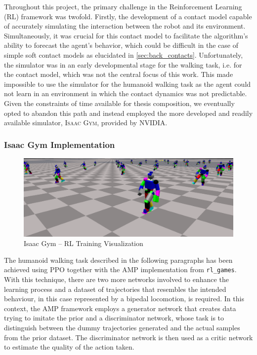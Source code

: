 Throughout this project, the primary challenge in the Reinforcement Learning (\ac{RL}) framework was twofold. Firstly, the development of a contact model capable of accurately simulating the interaction between the robot and its environment. Simultaneously, it was crucial for this contact model to facilitate the algorithm's ability to forecast the agent's behavior, which could be difficult in the case of simple soft contact models as elucidated in \cref{sec:back_contacts}. Unfortunately, the \jaxsim simulator was in an early developmental stage for the walking task, i.e. for the contact model, which was not the central focus of this work. This made impossible to use the \jaxsim simulator for the humanoid walking task as the agent could not learn in an environment in which the contact dynamics was not predictable. Given the constraints of time available for thesis composition, we eventually opted to abandon this path and instead employed the more developed and readily available simulator, \textsc{Isaac Gym}, provided by NVIDIA.

\subsubsection{Isaac Gym Implementation}

\begin{figure}
    \centering
    \caption{Isaac Gym -- RL Training Visualization}
    \label{fig:isaacgymtraining}
    \includegraphics[width=.9\textwidth]{Images/stickbot_training_1.png}
\end{figure}

The humanoid walking task described in the following paragraphs has been achieved using \ac{PPO} together with the \ac{AMP} implementation from \texttt{rl\_games}. With this technique, there are two more networks involved to enhance the learning process and a dataset of trajectories that resembles the intended behaviour, in this case represented by a bipedal locomotion, is required. In this context, the AMP framework employs a generator network that creates data trying to imitate the prior and a discriminator network, whose task is to distinguish between the dummy trajectories generated and the actual samples from the prior dataset. The discriminator network is then used as a critic network to estimate the quality of the action taken.

